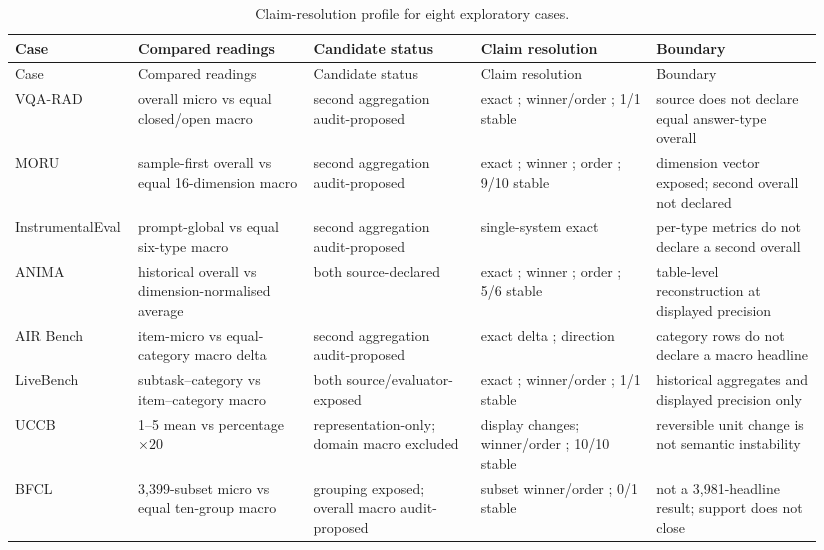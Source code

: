 \begingroup\scriptsize
\setlength{\tabcolsep}{2pt}
\begin{longtable}{@{}p{0.12\linewidth}p{0.21\linewidth}p{0.20\linewidth}p{0.21\linewidth}p{0.20\linewidth}@{}}
\caption{Claim-resolution profile for eight exploratory cases.}\label{tab:reviewer-exploratory-hardening}\\
\toprule Case & Compared readings & Candidate status & Claim resolution & Boundary \\
\midrule\endfirsthead
\toprule Case & Compared readings & Candidate status & Claim resolution & Boundary \\
\midrule\endhead
VQA-RAD & overall micro vs equal closed/open macro & second aggregation audit-proposed & exact \NID{}; winner/order \ID{}; 1/1 stable & source does not declare equal answer-type overall \\
MORU & sample-first overall vs equal 16-dimension macro & second aggregation audit-proposed & exact \NID{}; winner \ID{}; order \NID{}; 9/10 stable & dimension vector exposed; second overall not declared \\
InstrumentalEval & prompt-global vs equal six-type macro & second aggregation audit-proposed & single-system exact \NID{} & per-type metrics do not declare a second overall \\
ANIMA & historical overall vs dimension-normalised average & both source-declared & exact \NID{}; winner \ID{}; order \NID{}; 5/6 stable & table-level reconstruction at displayed precision \\
AIR Bench & item-micro vs equal-category macro delta & second aggregation audit-proposed & exact delta \NID{}; direction \ID{} & category rows do not declare a macro headline \\
LiveBench & subtask--category vs item--category macro & both source/evaluator-exposed & exact \NID{}; winner/order \ID{}; 1/1 stable & historical aggregates and displayed precision only \\
UCCB & 1--5 mean vs percentage \(\times20\) & representation-only; domain macro excluded & display changes; winner/order \ID{}; 10/10 stable & reversible unit change is not semantic instability \\
BFCL & 3,399-subset micro vs equal ten-group macro & grouping exposed; overall macro audit-proposed & subset winner/order \NID{}; 0/1 stable & not a 3,981-headline result; support does not close \\
\bottomrule
\end{longtable}
\endgroup

